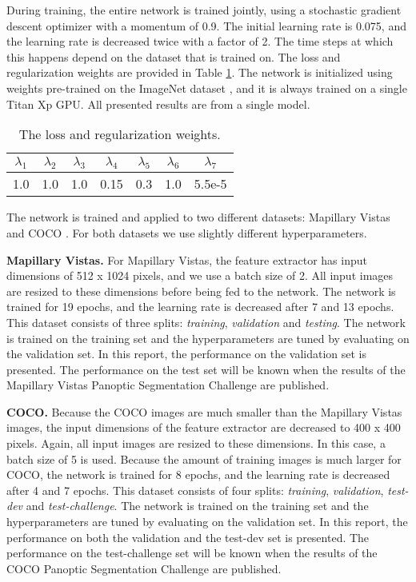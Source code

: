 \documentclass[10pt,twocolumn,letterpaper]{article}
\begin{document}
During training, the entire network is trained jointly, using a stochastic gradient descent optimizer with a momentum of 0.9. The initial learning rate is 0.075, and the learning rate is decreased twice with a factor of 2. The time steps at which this happens depend on the dataset that is trained on. The loss and regularization weights are provided in Table \ref{tab:loss_weights}. The network is initialized using weights pre-trained on the ImageNet dataset \cite{Deng2009}, and it is always trained on a single Titan Xp GPU. All presented results are from a single model. 


\begin{table}[H]
\centering
\begin{tabular}{ c | c | c | c | c | c | c}
$\lambda_1$ & $\lambda_2$ & $\lambda_3$ & $\lambda_4$ & $\lambda_5$ & $\lambda_6$ & $\lambda_7$ \\ \hline
1.0 & 1.0 & 1.0 & 0.15 & 0.3 & 1.0 & 5.5e-5 \\
\end{tabular}
\caption{The loss and regularization weights.}
\label{tab:loss_weights}
\end{table}

The network is trained and applied to two different datasets: Mapillary Vistas \cite{Neuhold2017} and COCO \cite{Lin2014}. For both datasets we use slightly different hyperparameters.

\textbf{Mapillary Vistas.} For Mapillary Vistas, the feature extractor has input dimensions of 512 x 1024 pixels, and we use a batch size of 2. All input images are resized to these dimensions before being fed to the network. The network is trained for 19 epochs, and the learning rate is decreased after 7 and 13 epochs. This dataset consists of three splits: \textit{training}, \textit{validation} and \textit{testing}. The network is trained on the training set and the hyperparameters are tuned by evaluating on the validation set. In this report, the performance on the validation set is presented. The performance on the test set will be known when the results of the Mapillary Vistas Panoptic Segmentation Challenge are published.

\textbf{COCO.} Because the COCO images are much smaller than the Mapillary Vistas images, the input dimensions of the feature extractor are decreased to 400 x 400 pixels. Again, all input images are resized to these dimensions. In this case, a batch size of 5 is used. Because the amount of training images is much larger for COCO, the network is trained for 8 epochs, and the learning rate is decreased after 4 and 7 epochs. This dataset consists of four splits: \textit{training}, \textit{validation}, \textit{test-dev} and \textit{test-challenge}. The network is trained on the training set and the hyperparameters are tuned by evaluating on the validation set. In this report, the performance on both the validation and the test-dev set is presented. The performance on the test-challenge set will be known when the results of the COCO Panoptic Segmentation Challenge are published.
\end{document}

